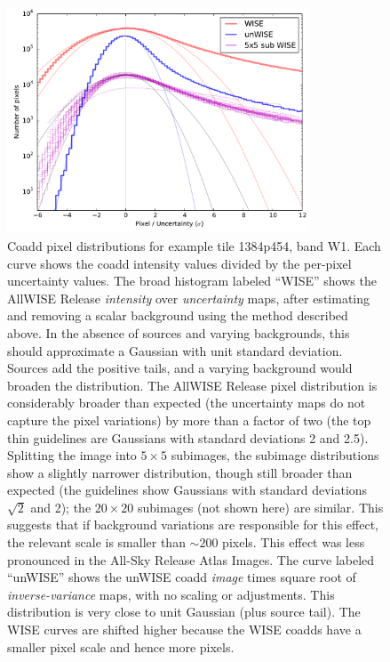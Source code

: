 \documentclass[11pt,preprint]{aastex}
\begin{document}
\begin{figure}
\begin{center}
\includegraphics[width=0.8\textwidth]{plots2/co-09}
\end{center}
\caption{Coadd pixel distributions for example tile 1384p454, band W1.
  Each curve shows the coadd intensity values divided by the per-pixel
  uncertainty values.  The broad histogram labeled ``WISE'' shows the
  AllWISE Release \emph{intensity} over \emph{uncertainty} maps, after
  estimating and removing a scalar background using the method
  described above.
  In the absence of sources and varying backgrounds, this should
  approximate a Gaussian with unit standard deviation.  Sources add
  the positive tails, and a varying background would broaden the
  distribution.
  The AllWISE Release pixel distribution is considerably broader than
  expected (the uncertainty maps do not capture the pixel variations)
  by more than a factor of two (the top thin guidelines are
  Gaussians with standard deviations 2 and 2.5).  Splitting the image into
  $5 \times 5$ subimages, the subimage distributions show a slightly
  narrower distribution, though still broader than expected (the
  guidelines show Gaussians with standard deviations $\sqrt{2}$
  and 2); the $20\times20$ subimages (not shown here) are similar.
  This suggests that if background variations are responsible for this
  effect, the relevant scale is smaller than $\sim200$ pixels.
  This effect was less pronounced in the All-Sky Release Atlas Images.
  The curve labeled ``unWISE'' shows the unWISE coadd \emph{image} times square
  root of \emph{inverse-variance} maps, with no scaling or
  adjustments.  This distribution is very close to unit Gaussian (plus
  source tail).  The WISE curves are shifted higher because the WISE
  coadds have a smaller pixel scale and hence more pixels.
  \label{fig:pixdist}}
\end{figure}
\end{document}
